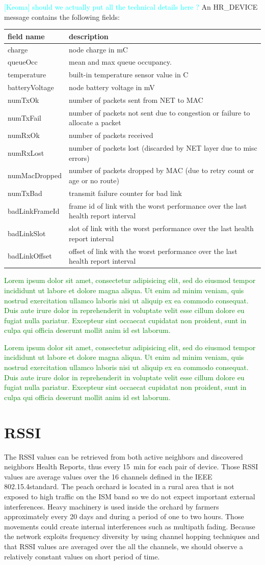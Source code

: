 \documentclass{sig-alternate}
\newcommand{\lorem}               {\textcolor{green}{Lorem ipsum dolor sit amet, consectetur adipisicing elit, sed do eiusmod tempor incididunt ut labore et dolore magna aliqua. Ut enim ad minim veniam, quis nostrud exercitation ullamco laboris nisi ut aliquip ex ea commodo consequat. Duis aute irure dolor in reprehenderit in voluptate velit esse cillum dolore eu fugiat nulla pariatur. Excepteur sint occaecat cupidatat non proident, sunt in culpa qui officia deserunt mollit anim id est laborum.}}
\newcommand{\keoma}[1]              {\textcolor{cyan}{[Keoma] #1}}
\begin{document}
\keoma{should we actually put all the technical details here ?}
An HR\_DEVICE message contains the following fields:
\begin{tabular}{l|p{6cm}}
    field name      & description\\
    \hline
    charge          & node charge in mC\\
    queueOcc        & mean and max queue occupancy.\\
    temperature     & built-in temperature sensor value in C\\
    batteryVoltage  & node battery voltage in mV\\
    numTxOk         & number of packets sent from NET to MAC\\
    numTxFail       & number of packets not sent due to congestion or failure to allocate a packet\\
    numRxOk         & number of packets received\\
    numRxLost       & number of packets lost (discarded by NET layer due to misc errors)\\
    numMacDropped   & number of packets dropped by MAC (due to retry count or age or no route)\\
    numTxBad        & transmit failure counter for bad link\\
    badLinkFrameId  & frame id of link with the worst performance over the last health report interval\\
    badLinkSlot     & slot of link with the worst performance over the last health report interval\\
    badLinkOffset   & offset of link with the worst performance over the last health report interval\\
\end{tabular}


\lorem


\lorem

\section{RSSI}
\label{sec:rssi}


The RSSI values can be retrieved from both active neighbors and discovered neighbors Health Reports, thus every 15~min for each pair of device.
Those RSSI values are average values over the 16 channels defined in the IEEE 802.15.4standard.
The peach orchard is located in a rural area that is not exposed to high traffic on the ISM band so we do not expect important external interferences.
Heavy machinery is used inside the orchard by farmers approximately every 20 days and during a period of one to two hours.
Those movements could create internal interferences such as multipath fading.
Because the network exploits frequency diversity by using channel hopping techniques and that RSSI values are averaged over the all the channels, we should observe a relatively constant values on short period of time.
\end{document}

